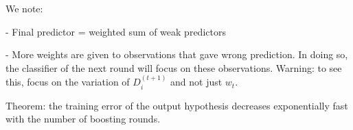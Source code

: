 We note:

- Final predictor = weighted sum of weak predictors

- More weights are given to observations that gave wrong prediction. In doing so, the classifier of the next round will focus on these observations. Warning: to see this, focus on the variation of $D^{(t+1)}_i$ and not just $w_t$.

\vspace{5mm}

Theorem: the training error of the output hypothesis decreases exponentially fast with the number of boosting rounds.